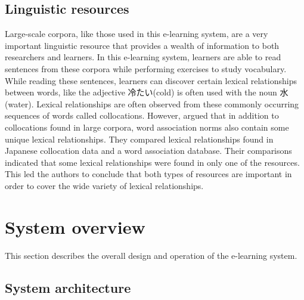 \documentclass[english]{jnlp_1.4}
\begin{document}
\subsection{Linguistic resources}

Large-scale corpora, like those used in this e-learning system, are a very important linguistic resource that provides a wealth of information to both researchers and learners. In this e-learning system, learners are able to read sentences from these corpora while performing exercises to study vocabulary. While reading these sentences, learners can discover certain lexical relationships between words, like the adjective 冷たい(cold) is often used with the noun 水(water). Lexical relationships are often observed from these commonly occurring sequences of words called collocations. However, \cite{Inproc_Joyce} argued that in addition to collocations found in large corpora, word association norms also contain some unique lexical relationships. They compared lexical relationships found in Japanese collocation data and a word association database. Their comparisons indicated that some lexical relationships were found in only one of the resources. This led the authors to conclude that both types of resources are important in order to cover the wide variety of lexical relationships.


\section{System overview}

This section describes the overall design and operation of the e-learning system.

\subsection{System architecture}
\end{document}
